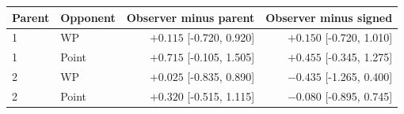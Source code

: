 \begin{tabular}{llrr}
\toprule
Parent & Opponent & Observer minus parent & Observer minus signed \\
\midrule
1 & WP & $+0.115$ [-0.720, 0.920] & $+0.150$ [-0.720, 1.010] \\
1 & Point & $+0.715$ [-0.105, 1.505] & $+0.455$ [-0.345, 1.275] \\
2 & WP & $+0.025$ [-0.835, 0.890] & $-0.435$ [-1.265, 0.400] \\
2 & Point & $+0.320$ [-0.515, 1.115] & $-0.080$ [-0.895, 0.745] \\
\bottomrule
\end{tabular}
